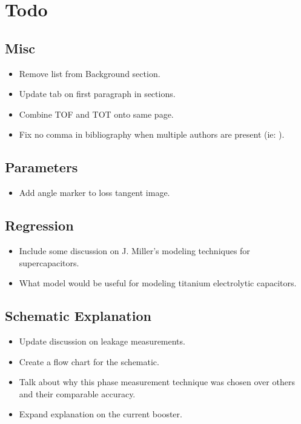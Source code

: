 \documentclass{article}
\begin{document}
\section{Todo}

\subsection{Misc}
\begin{itemize}
    \item Remove list from Background section.
    \item Update tab on first paragraph in sections.
    \item Combine TOF and TOT onto same page.
    \item Fix no comma in bibliography when multiple authors are present (ie: \cite{absCircuit}).
\end{itemize}

\subsection{Parameters}
\begin{itemize}
    \item Add angle marker to loss tangent image.
\end{itemize}

\subsection{Regression}
\begin{itemize}
    \item Include some discussion on J. Miller's modeling techniques for supercapacitors.
    \item What model would be useful for modeling titanium electrolytic capacitors.
\end{itemize}

\subsection{Schematic Explanation}
\begin{itemize}
    \item Update discussion on leakage measurements.
    \item Create a flow chart for the schematic.
    \item Talk about why this phase measurement technique was chosen over others and their comparable accuracy.
    \item Expand explanation on the current booster.
\end{itemize}


\end{document}
